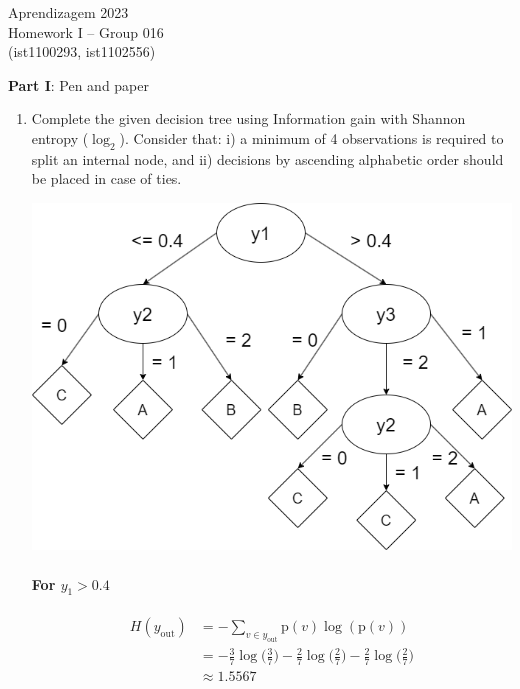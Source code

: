 \documentclass[12pt]{article}
\newcommand{\info}[2]{\frac{#1}{#2}\log\bigl( \frac{#1}{#2} \bigr)}
\begin{document}
\center
Aprendizagem 2023\\
Homework I -- Group 016\\
(ist1100293, ist1102556)\vskip 1cm

\large{\textbf{Part I}: Pen and paper}\normalsize

\begin{enumerate}[leftmargin=\labelsep]
\item Complete the given decision tree using Information gain with Shannon entropy ($\log_2$).
Consider that: i) a minimum of 4 observations is required to split an internal node, and
ii) decisions by ascending alphabetic order should be placed in case of ties.
 
\begin{center}
    \includegraphics[scale=0.3]{images/decision-tree.png}
\end{center}

\paragraph{For $y_1 > 0.4$}

\begin{equation}
    \begin{split}
        H(y_\textrm{out}) & = -\sum_{v \in y_\textrm{out}}\textrm{p}(v)\log(\textrm{p}(v)) \\
        & = -\info{3}{7} - \info{2}{7} - \info{2}{7} \\
        & \approx 1.5567
    \end{split}
\end{equation}


\end{enumerate}
\end{document}
